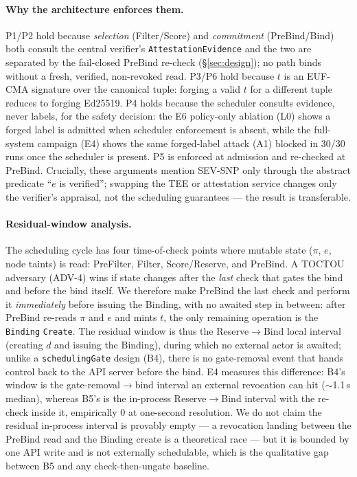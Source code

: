 \paragraph{Why the architecture enforces them.}
P1/P2 hold because \emph{selection} (Filter/Score) and \emph{commitment}
(PreBind/Bind) both consult the central verifier's \texttt{AttestationEvidence}
and the two are separated by the fail-closed PreBind re-check
(\S\ref{sec:design}); no path binds without a fresh, verified, non-revoked read.
P3/P6 hold because $t$ is an EUF-CMA signature over the canonical tuple: forging
a valid $t$ for a different tuple reduces to forging Ed25519. P4 holds because the
scheduler consults evidence, never labels, for the safety decision: the E6
policy-only ablation (L0) shows a forged label is admitted when scheduler
enforcement is absent, while the full-system campaign (E4) shows the same
forged-label attack (A1) blocked in 30/30 runs once the scheduler is present.
P5 is enforced at admission and re-checked at PreBind. Crucially, these arguments
mention SEV-SNP only through the abstract predicate ``$e$ is verified''; swapping
the TEE or attestation service changes only the verifier's appraisal, not the
scheduling guarantees --- the result is transferable.

\paragraph{Residual-window analysis.}
The scheduling cycle has four time-of-check points where mutable state ($\pi$,
$e$, node taints) is read: PreFilter, Filter, Score/Reserve, and PreBind. A
TOCTOU adversary (ADV-4) wins if state changes after the \emph{last} check that
gates the bind and before the bind itself. We therefore make PreBind the last
check and perform it \emph{immediately} before issuing the Binding, with no
awaited step in between: after PreBind re-reads $\pi$ and $e$ and mints $t$, the
only remaining operation is the \texttt{Binding} \texttt{Create}. The residual
window is thus the Reserve$\to$Bind local interval (creating $d$ and issuing the
Binding), during which no external actor is awaited; unlike a
\texttt{schedulingGate} design (B4), there is no gate-removal event that hands
control back to the API server before the bind. E4 measures this difference: B4's
window is the gate-removal$\to$bind interval an external revocation can hit
($\sim$1.1\,s median), whereas B5's is the in-process Reserve$\to$Bind interval
with the re-check inside it, empirically $0$ at one-second resolution. We do not
claim the residual in-process interval is provably empty --- a revocation landing
between the PreBind read and the Binding create is a theoretical race --- but it
is bounded by one API write and is not externally schedulable, which is the
qualitative gap between B5 and any check-then-ungate baseline.
